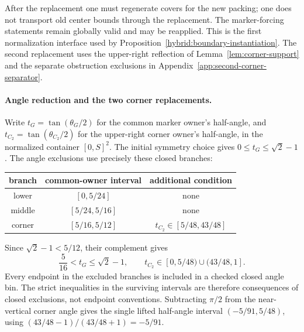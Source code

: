 \documentclass[11pt]{article}
\begin{document}
After the replacement one must regenerate covers for the new packing;
one does not transport old center bounds through the replacement.
The marker-forcing statements remain globally valid and may be reapplied.
This is the first normalization interface used by
Proposition~\ref{hybrid:boundary-instantiation}. The second replacement
uses the upper-right reflection of Lemma~\ref{lem:corner-support} and the
separate obstruction exclusions in Appendix~\ref{app:second-corner-separator}.


\paragraph{Angle reduction and the two corner replacements.}
Write $t_G=\tan(\theta_G/2)$ for the common marker owner's half-angle,
and $t_{C_2}=\tan(\theta_{C_2}/2)$ for the upper-right corner owner's
half-angle, in the normalized container $[0,S]^2$. The initial symmetry
choice gives $0\le t_G\le\sqrt2-1$. The angle exclusions use precisely
these closed branches:
\begin{center}
\begin{tabular}{c|c|c}
branch&common-owner interval&additional condition\\ \hline
lower&$[0,5/24]$&none\\
middle&$[5/24,5/16]$&none\\
corner&$[5/16,5/12]$&$t_{C_2}\in[5/48,43/48]$
\end{tabular}
\end{center}
Since $\sqrt2-1<5/12$, their complement gives
\[
 \frac5{16}<t_G\le\sqrt2-1,
 \qquad t_{C_2}\in[0,5/48)\cup(43/48,1].
\]
Every endpoint in the excluded branches is included in a checked closed
angle bin. The strict inequalities in the surviving intervals are
therefore consequences of closed exclusions, not endpoint conventions.
Subtracting $\pi/2$ from the near-vertical corner angle gives the single
lifted half-angle interval $(-5/91,5/48)$, using
$(43/48-1)/(43/48+1)=-5/91$.
\end{document}
